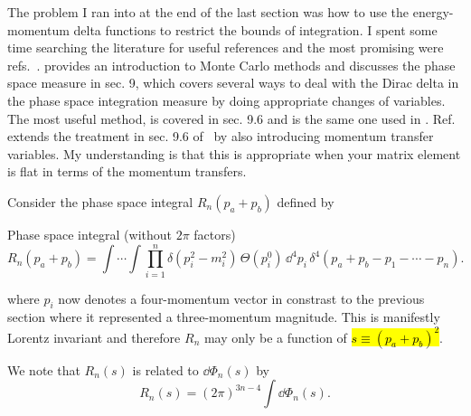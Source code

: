 \label{subsec:recursive-relation}
The problem I ran into at the end of the last section was how to use the energy-momentum delta functions to restrict the bounds of integration. 
I spent some time searching the literature for useful references and the most promising were refs.~\cite{James:1968gu,Byckling:1969sx,Isaacson:2021xty}.
\cite{James:1968gu} provides an introduction to Monte Carlo methods and discusses the phase space measure in sec. 9, which covers several ways to deal with the Dirac delta in the phase space integration measure by doing appropriate changes of variables.
The most useful method, is covered in sec. 9.6 and is the same one used in \cite{Byckling:1969sx}. 
Ref.~\cite{Byckling:1969sx} extends the treatment in sec. 9.6 of~\cite{James:1968gu} by also introducing momentum transfer variables. 
My understanding is that this is appropriate when your matrix element is flat in terms of the momentum transfers.

Consider the phase space integral $R_n(p_a + p_b)$ defined by
\begin{bluenv}{Phase space integral (without $2 \pi$ factors)}
    \vspace{-3ex}
    \begin{equation}
        \label{eq:phase-space-integral-without-2pi}
        R_n(p_a + p_b) = 
        \int \cdots \int \prod_{i=1}^{n} \delta (p_i^2 - m_i^2) \, \Theta(p_i^0) \, 
        \dd^4 p_i \, \delta^4(p_a + p_b - p_1 - \cdots - p_n).
    \end{equation}
\end{bluenv}
where $p_i$ now denotes a four-momentum vector in constrast to the previous section where it represented a three-momentum magnitude.
This is manifestly Lorentz invariant and therefore $R_n$ may only be a function of \hl{$s \equiv (p_a + p_b)^2$}. 

We note that $R_n(s)$ is related to $\dd \Phi_n(s)$ by
\begin{equation}
    R_n(s) = (2\pi)^{3n - 4} \int  \dd \Phi_n(s).
\end{equation} 



